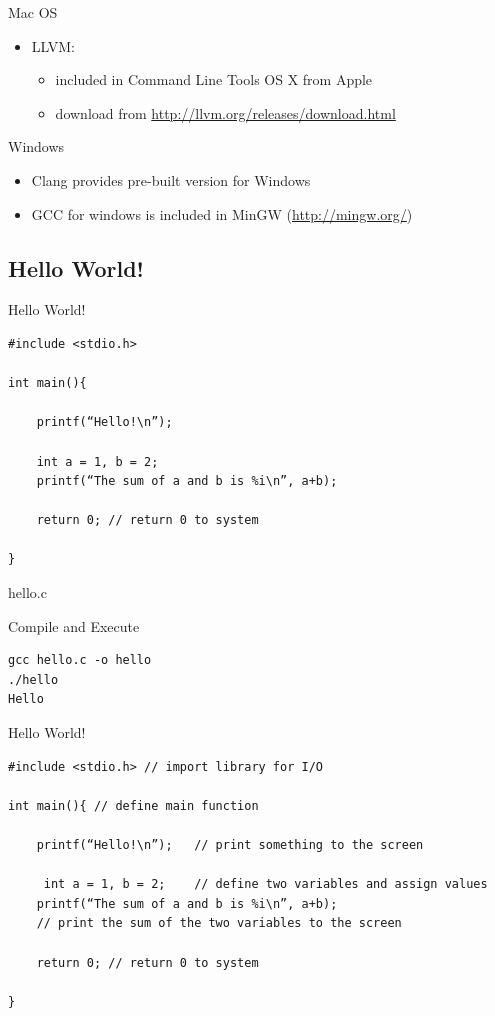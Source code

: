 \documentclass[UTF8]{beamer}
\begin{document}
\begin{frame}[t]{Mac OS}
    \begin{itemize}
        \item LLVM:
        \begin{itemize}
            \item included in Command Line Tools OS X from Apple
            \item download from \url{http://llvm.org/releases/download.html}
        \end{itemize}
    \end{itemize}
\end{frame}

\begin{frame}[t]{Windows}
    \begin{itemize}
        \item Clang provides pre-built version for Windows
        \item GCC for windows is included in MinGW (\url{http://mingw.org/})
    \end{itemize}
\end{frame}

\subsection{Hello World!}

\begin{frame}[t,fragile]{Hello World!}
    \begin{verbatim}
#include <stdio.h>

int main(){

	printf(“Hello!\n”);

	int a = 1, b = 2;
	printf(“The sum of a and b is %i\n”, a+b);

	return 0; // return 0 to system

}
    \end{verbatim}
    hello.c
\end{frame}

\begin{frame}[t, fragile]{Compile and Execute}
    \begin{verbatim}
gcc hello.c -o hello
./hello
Hello
    \end{verbatim}
\end{frame}

\begin{frame}[t,fragile]{Hello World!}
    \begin{verbatim}
#include <stdio.h> // import library for I/O

int main(){ // define main function

	printf(“Hello!\n”);   // print something to the screen

	 int a = 1, b = 2;    // define two variables and assign values
	printf(“The sum of a and b is %i\n”, a+b);
	// print the sum of the two variables to the screen

	return 0; // return 0 to system

}
    \end{verbatim}
\end{frame}
\end{document}
